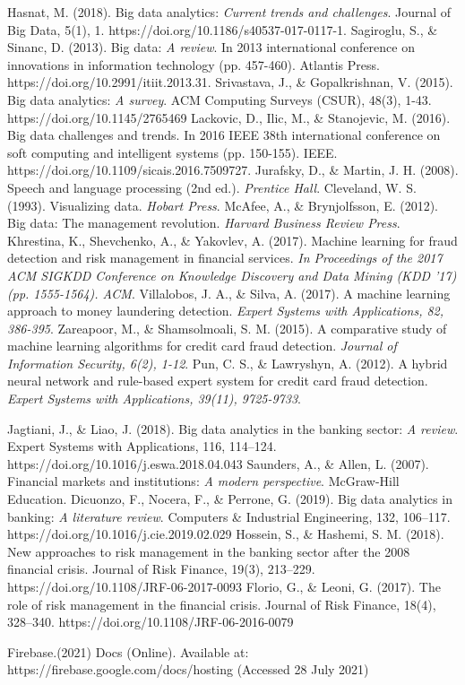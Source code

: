 \begin{thebibliography}{30}
 Hasnat, M. (2018). Big data analytics: \textit{Current trends and challenges}. Journal of Big Data, 5(1), 1. https://doi.org/10.1186/s40537-017-0117-1.
 Sagiroglu, S., \& Sinanc, D. (2013). Big data: \textit{A review}. In 2013 international conference on innovations in information technology (pp. 457-460). Atlantis Press. https://doi.org/10.2991/itiit.2013.31.
 Srivastava, J., \& Gopalkrishnan, V. (2015). Big data analytics: \textit{A survey}. ACM Computing Surveys (CSUR), 48(3), 1-43. https://doi.org/10.1145/2765469
 Lackovic, D., Ilic, M., \& Stanojevic, M. (2016). Big data challenges and trends. In 2016 IEEE 38th international conference on soft computing and intelligent systems (pp. 150-155). IEEE. https://doi.org/10.1109/sicais.2016.7509727.
 Jurafsky, D., \& Martin, J. H. (2008). Speech and language processing (2nd ed.). \textit{Prentice Hall}.
 Cleveland, W. S. (1993). Visualizing data. \textit{Hobart Press}.
 McAfee, A., \& Brynjolfsson, E. (2012). Big data: The management revolution. \textit{Harvard Business Review Press}.
 Khrestina, K., Shevchenko, A., \& Yakovlev, A. (2017). Machine learning for fraud detection and risk management in financial services. \textit{In Proceedings of the 2017 ACM SIGKDD Conference on Knowledge Discovery and Data Mining (KDD '17) (pp. 1555-1564). ACM}.
 Villalobos, J. A., \& Silva, A. (2017). A machine learning approach to money laundering detection. \textit{Expert Systems with Applications, 82, 386-395}.
 Zareapoor, M., \& Shamsolmoali, S. M. (2015). A comparative study of machine learning algorithms for credit card fraud detection. \textit{Journal of Information Security, 6(2), 1-12}.
 Pun, C. S., \& Lawryshyn, A. (2012). A hybrid neural network and rule-based expert system for credit card fraud detection. \textit{Expert Systems with Applications, 39(11), 9725-9733}.



 Jagtiani, J., \& Liao, J. (2018). Big data analytics in the banking sector: \textit{A review}. Expert Systems with Applications, 116, 114–124. https://doi.org/10.1016/j.eswa.2018.04.043
 Saunders, A., \& Allen, L. (2007). Financial markets and institutions: \textit{A modern perspective}. McGraw-Hill Education.
 Dicuonzo, F., Nocera, F., \& Perrone, G. (2019). Big data analytics in banking: \textit{A literature review}. Computers \& Industrial Engineering, 132, 106–117. https://doi.org/10.1016/j.cie.2019.02.029
 Hossein, S., \& Hashemi, S. M. (2018). New approaches to risk management in the banking sector after the 2008 financial crisis. Journal of Risk Finance, 19(3), 213–229. https://doi.org/10.1108/JRF-06-2017-0093
 Florio, G., \& Leoni, G. (2017). The role of risk management in the financial crisis. Journal of Risk Finance, 18(4), 328–340. https://doi.org/10.1108/JRF-06-2016-0079



 Firebase.(2021) Docs (Online). Available at: https://firebase.google.com/docs/hosting (Accessed 28 July 2021)

\end{thebibliography}